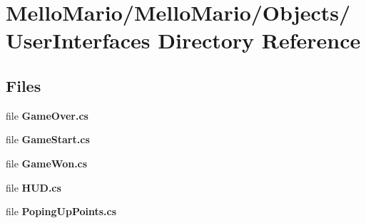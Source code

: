 \section{Mello\+Mario/\+Mello\+Mario/\+Objects/\+User\+Interfaces Directory Reference}
\label{dir_898f1a16836d7adccda29b0ee3285a70}
\subsection*{Files}
\begin{DoxyCompactItemize}
\item 
file \textbf{ Game\+Over.\+cs}
\item 
file \textbf{ Game\+Start.\+cs}
\item 
file \textbf{ Game\+Won.\+cs}
\item 
file \textbf{ H\+U\+D.\+cs}
\item 
file \textbf{ Poping\+Up\+Points.\+cs}
\end{DoxyCompactItemize}
